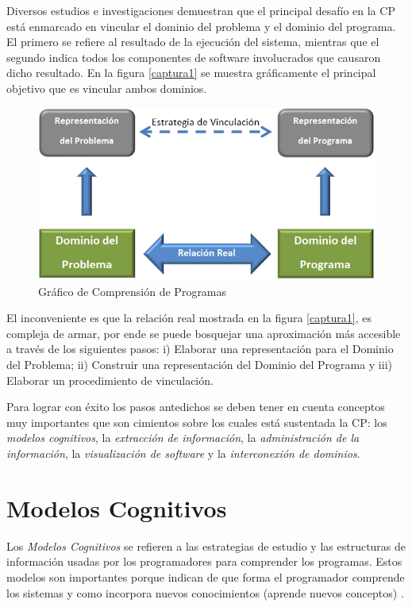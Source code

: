 \documentclass[a4paper,12pt]{report}
\begin{document}
Diversos estudios e investigaciones demuestran que el principal desafío en la CP está enmarcado en vincular el dominio del problema y el dominio del programa. El primero se refiere al resultado de la ejecución del sistema, mientras que el segundo indica todos los componentes de software involucrados que causaron dicho resultado. 
En la figura \ref{captura1} se muestra gráficamente el principal objetivo que es vincular ambos dominios. 

\begin{figure}[h] %
\centerline{%
\includegraphics[scale= 0.7]{./dom.png}
}
\caption{Gráfico de Comprensión de Programas}
\end{figure} \label{captura1}

El inconveniente es que la relación real mostrada en la figura \ref{captura1}, es compleja de armar, por ende se puede bosquejar una aproximación más accesible a través de los si\-guientes pasos: i) Elaborar una representación para el Dominio del Problema; ii)
Construir una representación del Dominio del Programa y iii) Elaborar un procedimiento de vinculación.
 
Para lograr con éxito los pasos antedichos se deben tener en cuenta conceptos muy importantes que son cimientos sobre los cuales está sustentada la CP: los \textit{modelos cognitivos}, la \textit{extracción de información}, la \textit{administración de la información}, la \textit{visualización de software} y la \textit{interconexión de dominios}.

\section{Modelos Cognitivos}

Los \textit{Modelos Cognitivos} se refieren a las estrategias de estudio y las estructuras de información usadas por los programadores para comprender los programas. Estos modelos son importantes porque indican de que forma el programador comprende los sistemas y como incorpora nuevos conocimientos (aprende nuevos conceptos) \cite{MBPHRU10}.
\end{document}
